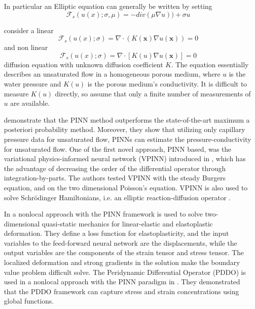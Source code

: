 \documentclass[pdflatex,sn-basic]{sn-jnl}%
\theoremstyle{thmstyleone}%
\theoremstyle{thmstyletwo}%
\theoremstyle{thmstylethree}%
\begin{document}
In particular an Elliptic equation can generally be written by setting
\begin{equation*}
\mathcal{F}_s(u(x); \sigma, \mu)  = - div(\mu \nabla u)) + \sigma u
\end{equation*}

\cite{Tar2020_PhysicsInformedDeep_MarTMP}
consider a linear 
\begin{equation*}
\mathcal{F}_s(u(x); \sigma)  =   \nabla \cdot (K(\mathbf{x}) \nabla u(\mathbf{x})) = 0 
\end{equation*}
and non linear 
\begin{equation*}
\mathcal{F}_s(u(x); \sigma)  =   \nabla \cdot [K(u)\nabla u(\mathbf{x})] =0
\end{equation*}
diffusion equation with unknown diffusion coefficient $K$. The equation essentially describes an unsaturated flow in a homogeneous porous medium, where $u$ is the water pressure and $K(u)$ is the porous medium's conductivity.  It is difficult to measure $K(u)$ directly, so \cite{Tar2020_PhysicsInformedDeep_MarTMP} assume that only a finite number of measurements of $u$ are available. 

\cite{Tar2020_PhysicsInformedDeep_MarTMP} demonstrate that the PINN method outperforms the state-of-the-art maximum a posteriori probability method.
Moreover, they show that utilizing only capillary pressure data for unsaturated flow, PINNs can estimate the pressure-conductivity for unsaturated flow. 
One of the first novel approach, PINN based, was the variational physics-informed neural network (VPINN) introduced in \cite{Kha2019_VariationalPhysicsInformed_ZhaKZK},  which has the advantage of decreasing the order of the differential operator through integration-by-parts. The authors tested VPINN with the steady Burgers equation, and on the two dimensional Poisson’s equation.
VPINN \cite{Kha2019_VariationalPhysicsInformed_ZhaKZK} is also used to solve Schrödinger Hamiltonians, i.e. an elliptic reaction-diffusion operator \citep{Gru2021_DeepNeuralNetwork_HajGHL}.

In \cite{Hag2021_NonlocalPhysicsInformed_BekHBMJ} a nonlocal approach with the PINN framework is used  to solve two-dimensional quasi-static mechanics for linear-elastic and elastoplastic deformation. They define a loss function for elastoplasticity, and the input  variables to the feed-forward neural network are the displacements, while the output variables are the components of the strain tensor and stress tensor.  The localized deformation and strong gradients in the solution make the boundary value problem difficult solve.
The Peridynamic Differential Operator (PDDO) is used in a nonlocal approach with the PINN paradigm in \cite{Hag2021_NonlocalPhysicsInformed_BekHBMJ}.
They demonstrated that the PDDO framework can capture stress and strain concentrations using global functions.
\end{document}
